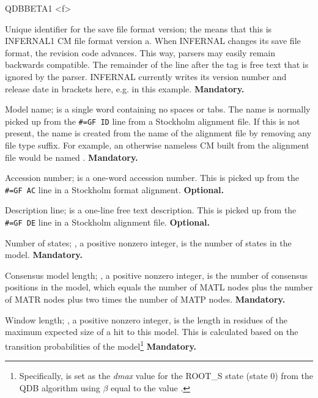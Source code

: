 \begin{sreitems}{QDBBETA1 <f>}

\item [\emprog{INFERNAL1/a}] Unique identifier for the save file format
  version; the  means that this is INFERNAL1 CM file format
  version a. When INFERNAL changes its save file format, the revision
  code advances. This way, parsers may easily remain backwards
  compatible. The remainder of the line after the  tag
  is free text that is ignored by the parser. INFERNAL currently writes
  its version number and release date in brackets here,
  e.g. \prog{[1.1 | April 2012]} in this
  example. \textbf{Mandatory.}

\item [\emprog{NAME <s>}] Model name;  is a single word
containing no spaces or tabs. The name is normally picked up from the
\verb+#=GF ID+ line from a Stockholm alignment file.  If this is not
present, the name is created from the name of the alignment file by
removing any file type suffix. For example, an otherwise nameless CM
built from the alignment file  would be named
.  \textbf{Mandatory.}

\item [\emprog{ACC <s>}] Accession number;  is a one-word
accession number. This is picked up from the \verb+#=GF AC+ line in a
Stockholm format alignment. \textbf{Optional.}

\item [\emprog{DESC <s>}] Description line;  is a one-line
free text description. This is picked up from the \verb+#=GF DE+ line
in a Stockholm alignment file. \textbf{Optional.}

\item [\emprog{STATES <d>}] Number of states; , a positive nonzero
integer, is the number of states in the model.
\textbf{Mandatory.}

\item [\emprog{CLEN <d>}] Consensus model length; , a positive nonzero
integer, is the number of consensus positions in the model, which
equals the number of MATL nodes plus the number of MATR nodes plus two
times the number of MATP nodes.
\textbf{Mandatory.}

\item [\emprog{W <d>}] Window length; , a positive nonzero
integer, is the length in residues of the maximum expected size of a
hit to this model. This is calculated based on the transition
probabilities of the model\footnote{Specifically,  is set as
the \emph{dmax} value for the ROOT\_S state (state 0) from the QDB
algorithm using $\beta$ equal to the  value
\cite{NawrockiEddy07}.}  \textbf{Mandatory.}


\end{sreitems}
